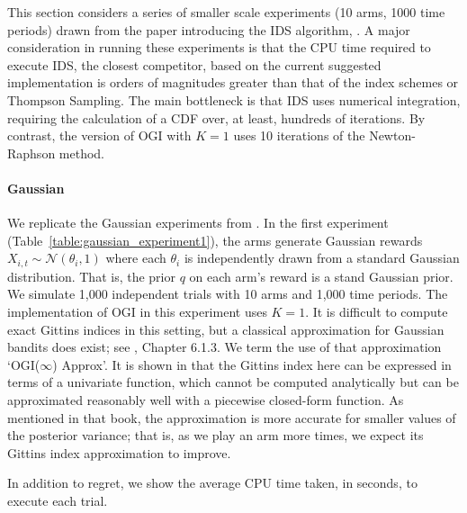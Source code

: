 This section considers a series of smaller scale experiments (10 arms, 1000 time periods) drawn from the paper introducing the IDS algorithm, \citep{russo2014learning}. A major consideration in running these experiments is that the CPU time required to execute IDS, the closest competitor, based on the current suggested implementation is orders of magnitudes greater than that of the index schemes or Thompson Sampling. The main bottleneck is that IDS uses numerical integration, requiring the calculation of a CDF over, at least, hundreds of iterations. By contrast, the version of OGI with $K=1$ uses 10 iterations of the Newton-Raphson method. 

\paragraph{Gaussian}We replicate the Gaussian experiments from \cite{russo2014learning}. In the first experiment (Table~\ref{table:gaussian_experiment1}), the arms generate Gaussian rewards  $X_{i,t} \sim \mathcal{N}(\theta_i, 1)$ where each $\theta_i$ is independently drawn from a standard Gaussian distribution. {That is, the prior $q$ on each arm's reward is a stand Gaussian prior.} We simulate 1,000 independent trials with 10 arms and 1,000 time periods. The implementation of OGI in this experiment uses $K = 1$. It is difficult to compute exact Gittins indices in this setting, but a classical approximation for Gaussian bandits does exist; see \cite{powell2012optimal}, Chapter 6.1.3. We term the use of that approximation `OGI($\infty$) Approx'. {\color{blue} It is shown in \citep{powell2012optimal} that the Gittins index here can be expressed in terms of a univariate function, which cannot be computed analytically but can be approximated reasonably well with a piecewise closed-form function. As mentioned in that book, the approximation is more accurate for smaller values of the posterior variance; that is, as we play an arm more times, we expect its Gittins index approximation to improve.}  

In addition to regret, we  show the average CPU time taken, in seconds, to execute each trial.

